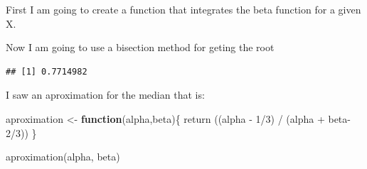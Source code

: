 \documentclass[
]{article}
\newenvironment{Shaded}{\begin{snugshade}}{\end{snugshade}}
\newcommand{\AttributeTok}[1]{\textcolor[rgb]{0.77,0.63,0.00}{#1}}
\newcommand{\ControlFlowTok}[1]{\textcolor[rgb]{0.13,0.29,0.53}{\textbf{#1}}}
\newcommand{\DecValTok}[1]{\textcolor[rgb]{0.00,0.00,0.81}{#1}}
\newcommand{\FloatTok}[1]{\textcolor[rgb]{0.00,0.00,0.81}{#1}}
\newcommand{\FunctionTok}[1]{\textcolor[rgb]{0.00,0.00,0.00}{#1}}
\newcommand{\NormalTok}[1]{#1}
\newcommand{\OtherTok}[1]{\textcolor[rgb]{0.56,0.35,0.01}{#1}}
\newcommand{\SpecialCharTok}[1]{\textcolor[rgb]{0.00,0.00,0.00}{#1}}
\begin{document}
First I am going to create a function that integrates the beta function
for a given X.

\begin{Shaded}
\end{Shaded}

Now I am going to use a bisection method for geting the root

\begin{Shaded}
\end{Shaded}

\begin{verbatim}
## [1] 0.7714982
\end{verbatim}

I saw an aproximation for the median that is:

\begin{Shaded}
\begin{Highlighting}[]
\NormalTok{aproximation }\OtherTok{\textless{}{-}} \ControlFlowTok{function}\NormalTok{(alpha,beta)\{}
    \FunctionTok{return}\NormalTok{ ((alpha }\SpecialCharTok{{-}} \DecValTok{1}\SpecialCharTok{/}\DecValTok{3}\NormalTok{) }\SpecialCharTok{/}\NormalTok{ (alpha }\SpecialCharTok{+}\NormalTok{ beta}\DecValTok{{-}2}\SpecialCharTok{/}\DecValTok{3}\NormalTok{))}
\NormalTok{\}}

\FunctionTok{aproximation}\NormalTok{(alpha, beta)}
\end{Highlighting}
\end{Shaded}
\end{document}
